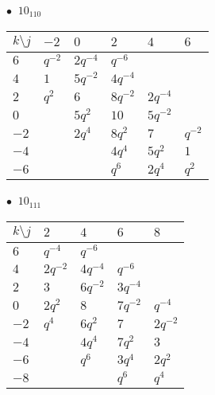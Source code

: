 \begin{minipage}{\linewidth}
$\bullet\ $ $10_{110}$ \vspace{0.5em} \\
\begin{tabular}{l|lllll}
$k \setminus j$ & $-2$ & $0$ & $2$ & $4$ & $6$ \\
\hline
$6$ & $q^{-2}$ & $2q^{-4}$ & $q^{-6}$ &  &  \\
$4$ & $1$ & $5q^{-2}$ & $4q^{-4}$ &  &  \\
$2$ & $q^{2}$ & $6$ & $8q^{-2}$ & $2q^{-4}$ &  \\
$0$ &  & $5q^{2}$ & $10$ & $5q^{-2}$ &  \\
$-2$ &  & $2q^{4}$ & $8q^{2}$ & $7$ & $q^{-2}$ \\
$-4$ &  &  & $4q^{4}$ & $5q^{2}$ & $1$ \\
$-6$ &  &  & $q^{6}$ & $2q^{4}$ & $q^{2}$ \\
\end{tabular}
\vspace{2em}
\end{minipage}
%
\begin{minipage}{\linewidth}
$\bullet\ $ $10_{111}$ \vspace{0.5em} \\
\begin{tabular}{l|llll}
$k \setminus j$ & $2$ & $4$ & $6$ & $8$ \\
\hline
$6$ & $q^{-4}$ & $q^{-6}$ &  &  \\
$4$ & $2q^{-2}$ & $4q^{-4}$ & $q^{-6}$ &  \\
$2$ & $3$ & $6q^{-2}$ & $3q^{-4}$ &  \\
$0$ & $2q^{2}$ & $8$ & $7q^{-2}$ & $q^{-4}$ \\
$-2$ & $q^{4}$ & $6q^{2}$ & $7$ & $2q^{-2}$ \\
$-4$ &  & $4q^{4}$ & $7q^{2}$ & $3$ \\
$-6$ &  & $q^{6}$ & $3q^{4}$ & $2q^{2}$ \\
$-8$ &  &  & $q^{6}$ & $q^{4}$ \\
\end{tabular}
\vspace{2em}
\end{minipage}
%
